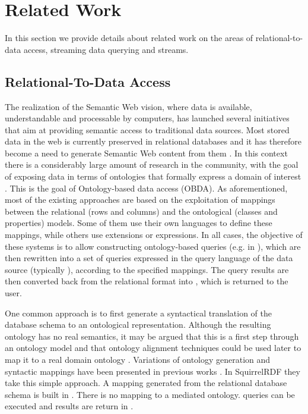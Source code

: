\section{Related Work}
\label{sec:related-work}

In this section we provide details about related work on the areas of relational-to-\rdf data access, streaming data querying and \rdf streams.

\subsection{Relational-To-\rdf Data Access}
\label{sec:rdbtordf}
The realization of the Semantic Web vision, where data is available, understandable and processable by computers, has launched several initiatives that aim at providing semantic access to traditional data sources.
Most stored data in the web is currently preserved in relational databases and it has therefore become a need to generate Semantic Web content from them \cite{Sahoo_09}. In this context there is a considerably large amount of research in the community, with the goal of exposing data in terms of ontologies that formally express a domain of interest \cite{Poggi_08}. This is the goal of Ontology-based data access (OBDA).
%
As aforementioned, most of the existing approaches are based on the exploitation of mappings between the relational (rows and columns) and the ontological (classes and properties) models. Some of them use their own languages to define
these mappings, while others use \sparql extensions or \sql expressions.
In all cases, the objective of these systems is to allow constructing ontology-based queries (e.g. in \sparql), which
are then rewritten into a set of queries expressed in the query language of the data source (typically \sql), according
to the specified mappings. The query results are then converted back from the relational format into \rdf, which is returned to the user.

One common approach is to first generate a syntactical translation of the database schema to an ontological representation. Although the resulting ontology has no real semantics, it may be argued that this is a first step through an ontology model and that ontology alignment techniques could be used later to map it to a real domain ontology \cite{Lubyte_09}. Variations of ontology generation and syntactic mappings have been presented in previous works \cite{Seaborne_07,Cerbah_08,Laborda_06,Prudhommeaux_07}.
In SquirrelRDF \cite{Squirrell_06} they take this simple approach. A mapping generated from the relational database schema is built in \rdf. There is no mapping to a mediated ontology. \sparql queries can be executed and results are return in \rdf.

